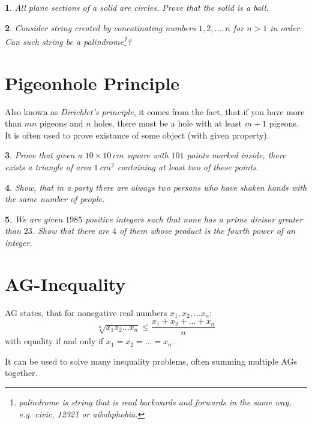 \documentclass[12pt]{article}
\newtheorem{problem}{}
\begin{document}
\begin{problem}
All plane sections of a solid are circles. Prove that the solid is a ball.
\end{problem}

\begin{problem}
Consider string created by concatinating numbers $1,2,\dots,n$ for $n>1$ in order. Can such string be a palindrome\footnote{\emph{palindrome} is string that is read backwards and forwards in the same way, e.g. civic, 12321 or aibohphobia.}?
\end{problem}

\section{Pigeonhole Principle}

Also known as \emph{Dirichlet's principle}, it comes from the fact, that if you have more than $mn$ pigeons and $n$ holes, there must be a hole with at least $m+1$ pigeons. It is often used to prove existance of some object (with given property).

\begin{problem}
Prove that given a $10\times10\ cm$ square with $101$ points marked inside, there exists a triangle of area $1\ cm^2$ containing at least two of these points. 
\end{problem}

\begin{problem}
Show, that in a party there are always two persons who have shaken hands with the same number of people.
\end{problem}

\begin{problem}
We are given $1985$ positive integers such that none has a prime divisor greater than $23$. Show that there are $4$ of them whose product is the fourth power of an integer.
\end{problem}

\section{AG-Inequality}

AG states, that for nonegative real numbers $x_1, x_2, \dots x_n$: 
\[\sqrt[n]{x_1x_2\dots x_n} \le  \frac{x_1 + x_2 + \dots + x_n}{n}\] 
with equality if and only if $x_1 = x_2 = \dots = x_n$.

It can be used to solve many inequality problems, often summing multiple AGs together.
\end{document}
